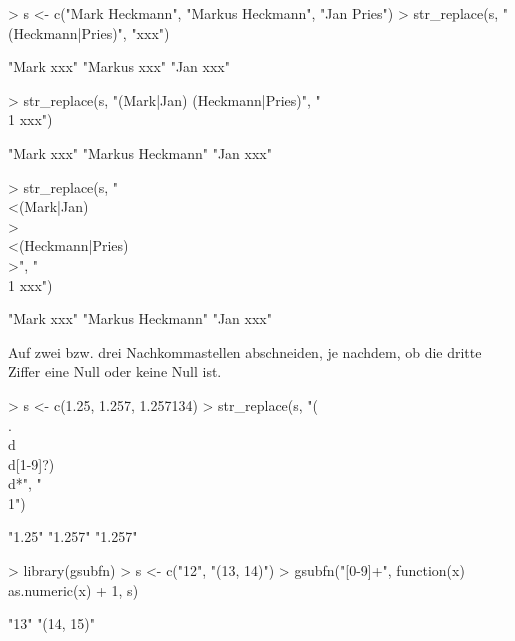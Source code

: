 \documentclass[a4paper]{report}
\begin{document}
\begin{Schunk}
\begin{Sinput}
> s <- c("Mark Heckmann", "Markus Heckmann", "Jan Pries")
> str_replace(s, "(Heckmann|Pries)", "xxx")
\end{Sinput}
\begin{Soutput}
[1] "Mark xxx"   "Markus xxx" "Jan xxx"   
\end{Soutput}
\begin{Sinput}
> str_replace(s, "(Mark|Jan) (Heckmann|Pries)", "\\1 xxx") 
\end{Sinput}
\begin{Soutput}
[1] "Mark xxx"        "Markus Heckmann" "Jan xxx"        
\end{Soutput}
\begin{Sinput}
> str_replace(s, "\\<(Mark|Jan)\\> \\<(Heckmann|Pries)\\>", "\\1 xxx") 
\end{Sinput}
\begin{Soutput}
[1] "Mark xxx"        "Markus Heckmann" "Jan xxx"        
\end{Soutput}
\end{Schunk}

Auf zwei bzw. drei Nachkommastellen abschneiden, je nachdem, ob die dritte Ziffer eine Null oder keine Null ist.

\begin{Schunk}
\begin{Sinput}
> s <- c(1.25, 1.257, 1.257134)
> str_replace(s, "(\\.\\d\\d[1-9]?)\\d*", "\\1")
\end{Sinput}
\begin{Soutput}
[1] "1.25"  "1.257" "1.257"
\end{Soutput}
\end{Schunk}

\begin{Schunk}
\begin{Sinput}
> library(gsubfn)
> s <- c("12", "(13, 14)") 
> gsubfn("[0-9]+", function(x) as.numeric(x) + 1, s) 
\end{Sinput}
\begin{Soutput}
[1] "13"       "(14, 15)"
\end{Soutput}
\end{Schunk}
\end{document}
